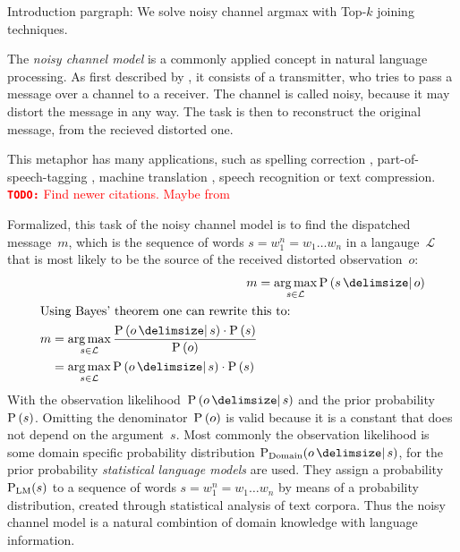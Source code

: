 \documentclass[m,bachelor,binding,palatino]{WeSTthesis}
\DeclareMathOperator*{\Argmax}{arg\,max}
\newcommand{\Language}{\mathcal{L}}
\newenvironment{draft}{\color{draftcolor}}{}
\newcommand{\todo}[1]{\textcolor{red}{{\footnotesize\textbf{\texttt{TODO:}}} #1}}
\begin{document}
\begin{draft}
Introduction pargraph: We solve noisy channel argmax with Top-$k$ joining
techniques.
\end{draft}

The \emph{noisy channel model} is a commonly applied concept in natural language
processing.
As first described by \cite{Shannon1948}, it consists of a transmitter, who
tries to pass a message over a channel to a receiver.
The channel is called noisy, because it may distort the message in any way.
The task is then to reconstruct the original message, from the recieved
distorted one.

This metaphor has many applications, such as spelling correction
\parencite{JurafskyMartin2009,Manning2008,Kernighan1990,Mays1991},
part-of-speech-tagging \parencite{Church1988}, machine translation
\parencite{Brown1990}, speech recognition or text compression.
\todo{Find newer citations. Maybe from \cite{Bickel2005}}

Formalized, this task of the noisy channel model is to find the dispatched
message~$m$, which is the sequence of words $s = w_1^n = w_1 \ldots w_n$ in a
langauge~$\Language$ that is most likely to be the source of the received
distorted observation~$o$:
\begin{align}
  \label{eq:noisychannel}
  m &= \Argmax_{s \in \Language} \Prob{s}{o} \\
  \intertext{Using Bayes' theorem one can rewrite this to:}
  \label{eq:noisychannelbayes}
  \begin{split}
    m &= \Argmax_{s \in \Language} \frac{\Prob{o}{s} \cdot \Prob{s}}{\Prob{o}} \\
      &= \Argmax_{s \in \Language} \Prob{o}{s} \cdot \Prob{s}
  \end{split}
\end{align}
With the observation likelihood~$\Prob{o}{s}$ and the prior
probability~$\Prob{s}$.
Omitting the denominator~$\Prob{o}$ is valid because it is a constant that does
not depend on the argument~$s$.
Most commonly the observation likelihood is some domain specific probability
distribution $\Prob[\text{Domain}]{o}{s}$, for the prior probability
\emph{statistical language models} are used.
They assign a probability $\Prob[\text{LM}]{s}$ to a sequence of words
$s = w_1^n = w_1 \ldots w_n$ by means of a probability distribution, created
through statistical analysis of text corpora.
Thus the noisy channel model is a natural combintion of domain knowledge with
language information.
\end{document}

